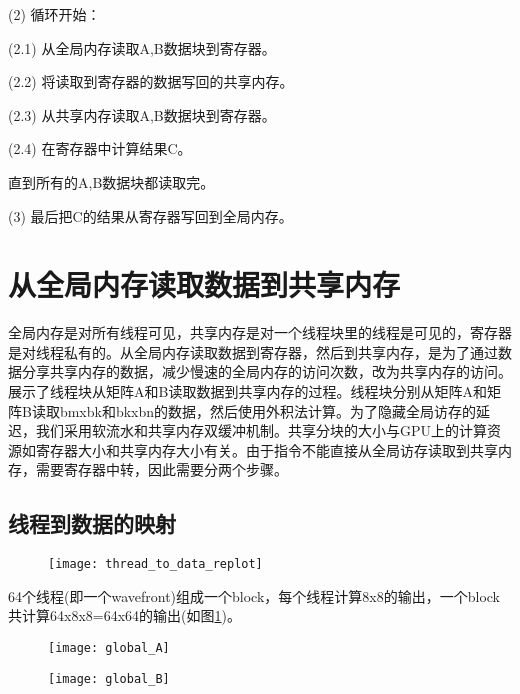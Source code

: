 (2) 循环开始：

\qquad(2.1) 从全局内存读取A,B数据块到寄存器。

\qquad(2.2) 将读取到寄存器的数据写回的共享内存。

\qquad(2.3) 从共享内存读取A,B数据块到寄存器。

\qquad(2.4) 在寄存器中计算结果C。

\qquad 直到所有的A,B数据块都读取完。

(3) 最后把C的结果从寄存器写回到全局内存。


\section{从全局内存读取数据到共享内存}
全局内存是对所有线程可见，共享内存是对一个线程块里的线程是可见的，寄存器是对线程私有的。从全局内存读取数据到寄存器，然后到共享内存，是为了通过数据分享共享内存的数据，减少慢速的全局内存的访问次数，改为共享内存的访问。展示了线程块从矩阵A和B读取数据到共享内存的过程。线程块分别从矩阵A和矩阵B读取bmxbk和bkxbn的数据，然后使用外积法计算。为了隐藏全局访存的延迟，我们采用软流水和共享内存双缓冲机制。共享分块的大小与GPU上的计算资源如寄存器大小和共享内存大小有关。由于指令不能直接从全局访存读取到共享内存，需要寄存器中转，因此需要分两个步骤。

\subsection{线程到数据的映射}

\begin{figure}[htbp]
	\centering
	\texttt{[image: thread\_to\_data\_replot]}
	\label{fig:thread_to_data_replot}
\end{figure}

64个线程(即一个wavefront)组成一个block，每个线程计算8x8的输出，一个block共计算64x8x8=64x64的输出(如图\ref{fig:thread_to_data_replot})。

\begin{figure}[htbp]
	\centering
	\texttt{[image: global\_A]}
	\label{fig:global_A}
\end{figure}

\begin{figure}[htbp]
	\centering
	\texttt{[image: global\_B]}
	\label{fig:global_B}
\end{figure}


